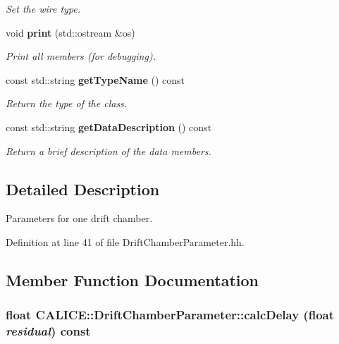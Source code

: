 \begin{DoxyCompactItemize}
\begin{DoxyCompactList}\small\item\em Set the wire type. \item\end{DoxyCompactList}\item 
void {\bf print} (std::ostream \&os)\label{classCALICE_1_1DriftChamberParameter_ab1c4711a572d91c6baff942c93b42241}

\begin{DoxyCompactList}\small\item\em Print all members (for debugging). \item\end{DoxyCompactList}\item 
const std::string {\bf getTypeName} () const \label{classCALICE_1_1DriftChamberParameter_a20a1522331c7491a899b118af3bfb4b5}

\begin{DoxyCompactList}\small\item\em Return the type of the class. \item\end{DoxyCompactList}\item 
const std::string {\bf getDataDescription} () const \label{classCALICE_1_1DriftChamberParameter_affafce2f39862cdf7bb2a757bc95b288}

\begin{DoxyCompactList}\small\item\em Return a brief description of the data members. \item\end{DoxyCompactList}\end{DoxyCompactItemize}


\subsection{Detailed Description}
Parameters for one drift chamber. 

Definition at line 41 of file DriftChamberParameter.hh.

\subsection{Member Function Documentation}
\subsubsection[{calcDelay}]{\setlength{\rightskip}{0pt plus 5cm}float CALICE::DriftChamberParameter::calcDelay (float {\em residual}) const\hspace{0.3cm}{\ttfamily  [inline]}}\label{classCALICE_1_1DriftChamberParameter_ab79e1f5bcf0da040c4af2b2ad23b43b5}


